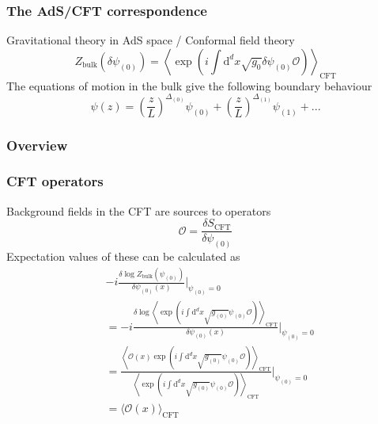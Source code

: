 \documentclass{beamer}
\renewcommand{\d}{\ensuremath{\mathrm{d}}}
\renewcommand{\i}{\ensuremath{i}}
\begin{document}
\begin{frame}
\frametitle{The AdS/CFT correspondence}
Gravitational theory in AdS space / Conformal field theory
\begin{equation}
 Z_{\mathrm{bulk}}(\delta\psi_{(0)})=\left\langle\exp(\i\int\d^dx\sqrt{g_0}\delta\psi_{(0)}\mathcal{O})\right\rangle_{\mathrm{CFT}}\label{fulCorr}
\end{equation}
The equations of motion in the bulk give the following boundary behaviour
\begin{equation}
 \psi(z)=\left(\frac{z}{L}\right)^{\Delta_{(0)}}\psi_{(0)}+
\left(\frac{z}{L}\right)^{\Delta_{(1)}}\psi_{(1)}+...
\end{equation}
\end{frame}

\begin{frame}
\frametitle{Overview}
\begin{figure}
 \centering
{}
\end{figure}
\end{frame}

\begin{frame}
\frametitle{CFT operators}
Background fields in the CFT are sources to operators
\begin{equation}
\mathcal{O}= \frac{\delta S_{\mathrm{CFT}}}{\delta \psi_{(0)}}
\end{equation}
Expectation values of these can be calculated as
\begin{equation}
\begin{split}
&-\i\frac{\delta\log Z_{\mathrm{bulk}}(\psi_{(0)})}{\delta\psi_{(0)}(x)}|_{\psi_{(0)}=0}\\
&=-\i\frac{\delta\log\left\langle\exp(\i\int\d^dx\sqrt{g_{(0)}}\psi_{(0)}\mathcal{O})\right\rangle_{\mathrm{CFT}}}{\delta\psi_{(0)}(x)}|_{\psi_{(0)}=0}\\
&=\frac{\left\langle\mathcal{O}(x)\exp(\i\int\d^dx\sqrt{g_{(0)}}\psi_{(0)}\mathcal{O})\right\rangle_{\mathrm{CFT}}}{\left\langle\exp(\i\int\d^dx\sqrt{g_{(0)}}\psi_{(0)}\mathcal{O})\right\rangle_{\mathrm{CFT}}}|_{\psi_{(0)}=0}\\
&=\langle \mathcal{O}(x) \rangle_{\mathrm{CFT}}
\end{split}
\end{equation}
\end{frame}
\end{document}
